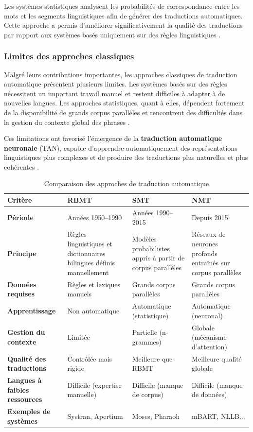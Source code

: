 Les systèmes statistiques analysent les probabilités de correspondance entre les mots et les segments linguistiques afin de générer des traductions automatiques. Cette approche a permis d'améliorer significativement la qualité des traductions par rapport aux systèmes basés uniquement sur des règles linguistiques \cite{ahmadnia2018neural}.

\subsubsection{Limites des approches classiques}

Malgré leurs contributions importantes, les approches classiques de traduction automatique présentent plusieurs limites. Les systèmes basés sur des règles nécessitent un important travail manuel et restent difficiles à adapter à de nouvelles langues. Les approches statistiques, quant à elles, dépendent fortement de la disponibilité de grands corpus parallèles et rencontrent des difficultés dans la gestion du contexte global des phrases \cite{ranathunga2023neural}.

Ces limitations ont favorisé l'émergence de la \textbf{traduction automatique neuronale} (\ac{TAN}), capable d'apprendre automatiquement des représentations linguistiques plus complexes et de produire des traductions plus naturelles et plus cohérentes \cite{vaswani2017attention}.

\begin{table}[H]
\centering
\renewcommand{\arraystretch}{1.5}
\begin{tabular}{p{3.2cm}p{3.5cm}p{3.5cm}p{3.5cm}}
\toprule
\textbf{Critère} & \textbf{\ac{RBMT}} & \textbf{\ac{SMT}} & \textbf{\ac{NMT}} \\
\midrule
\textbf{Période} & Années 1950--1990 & Années 1990--2015 & Depuis 2015 \\
\textbf{Principe} & Règles linguistiques et dictionnaires bilingues définis manuellement & Modèles probabilistes appris à partir de corpus parallèles & Réseaux de neurones profonds entraînés sur corpus parallèles \\
\textbf{Données requises} & Règles et lexiques manuels & Grands corpus parallèles & Grands corpus parallèles \\
\textbf{Apprentissage} & Non automatique & Automatique (statistique) & Automatique (neuronal) \\
\textbf{Gestion du contexte} & Limitée & Partielle (n-grammes) & Globale (mécanisme d'attention) \\
\textbf{Qualité des traductions} & Contrôlée mais rigide & Meilleure que \ac{RBMT} & Meilleure qualité globale \\
\textbf{Langues à faibles ressources} & Difficile (expertise manuelle) & Difficile (manque de corpus) & Difficile (manque de données) \\
\textbf{Exemples de systèmes} & Systran, Apertium & Moses, Pharaoh & mBART, NLLB... \\
\bottomrule
\end{tabular}
\caption{Comparaison des approches de traduction automatique}
\label{tab:comparaison_ta}
\end{table}

